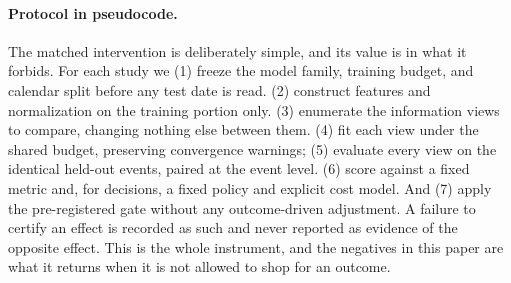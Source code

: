 

\paragraph{Protocol in pseudocode.} The matched intervention is deliberately simple, and its
value is in what it forbids. For each study we (1) freeze the model family, training budget,
and calendar split before any test date is read. (2) construct features and normalization on
the training portion only. (3) enumerate the information views to compare, changing nothing
else between them. (4) fit each view under the shared budget, preserving convergence warnings;
(5) evaluate every view on the identical held-out events, paired at the event level. (6) score
against a fixed metric and, for decisions, a fixed policy and explicit cost model. And (7)
apply the pre-registered gate without any outcome-driven adjustment. A failure to certify an
effect is recorded as such and never reported as evidence of the opposite effect. This is the
whole instrument, and the negatives in this paper are what it returns when it is not allowed
to shop for an outcome.
